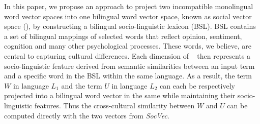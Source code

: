 %
%
In this paper, we propose an approach to project 
two incompatible monolingual word vector spaces into 
one bilingual word vector space, known as social vector space (\textit{\socvec}), by constructing a bilingual socio-linguistic lexicon (BSL).
BSL contains a set of bilingual mappings of selected words
that reflect opinion, sentiment, cognition and many other psychological 
processes. These words, we believe, are central to capturing cultural
differences.  
Each dimension of \textit{\socvec}~ then represents a socio-linguistic feature 
derived from semantic similarities between an input term and a specific word 
in the BSL within the same language. 
As a result, the term $W$ in language $L_1$ and the term $U$ in 
language $L_2$ can each be respectively projected 
into a bilingual word vector in the same \textit{\socvec} while maintaining
their socio-linguistic features. Thus the cross-cultural similarity 
between $W$ and $U$ can be computed directly with the two vectors 
from \textit{SocVec}. 

